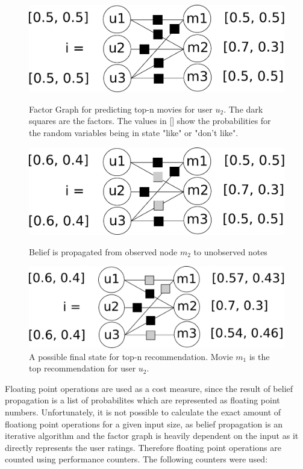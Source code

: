 \begin{figure}[h]\centering

    \includegraphics[scale=0.33]{graphics/top-n-graph.pdf}
\caption{Factor Graph for predicting top-n movies for user $u_2$. The dark squares are the factors. The values in [] show the probabilities for the random variables being in state "like" or "don't like".\label{top_n_graph}}

\includegraphics[scale=0.33]{graphics/top-n-important-messages.pdf}
  \caption{Belief is propagated from observed node $m_2$ to unobserved notes \label{top_n_graph_important_msg}}

    \includegraphics[scale=0.33]{graphics/top-n-final.pdf}
  \caption{A possible final state for top-n recommendation. Movie $m_1$ is the top recommendation for user $u_2$. \label{top_n_graph_final_state}}

\end{figure}


Floating point operations are used as a cost measure, since the result of belief propagation is a list of probabilites which are represented as floating point numbers. Unfortunately, it is not possible to calculate the exact amount of floationg point operations for a given input size, as belief propagation is an iterative algorithm and the factor graph is heavily dependent on the input as it directly represents the user ratings. Therefore floating point operations are counted using performance counters. The following counters were used:

